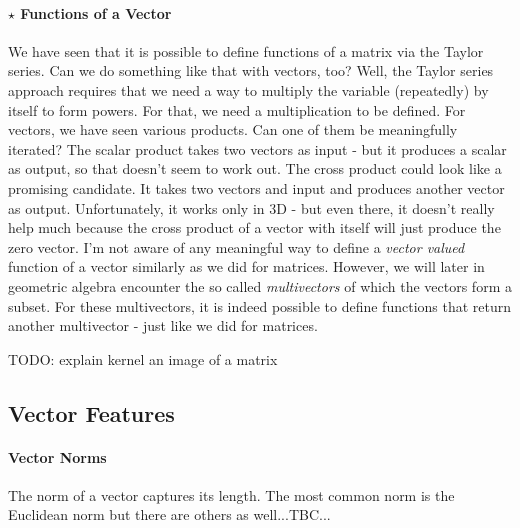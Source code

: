 \paragraph{$\star$ Functions of a Vector}
We have seen that it is possible to define functions of a matrix via the Taylor series. Can we do something like that with vectors, too? Well, the Taylor series approach requires that we need a way to multiply the variable (repeatedly) by itself to form powers. For that, we need a multiplication to be defined. For vectors, we have seen various products. Can one of them be meaningfully iterated? The scalar product takes two vectors as input - but it produces a scalar as output, so that doesn't seem to work out. The cross product could look like a promising candidate. It takes two vectors and input and produces another vector as output. Unfortunately, it works only in 3D - but even there, it doesn't really help much because the cross product of a vector with itself will just produce the zero vector. I'm not aware of any meaningful way to define a \emph{vector valued} function of a vector similarly as we did for matrices. However, we will later in geometric algebra encounter the so called \emph{multivectors} of which the vectors form a subset. For these multivectors, it is indeed possible to define functions that return another multivector - just like we did for matrices.

\medskip
TODO: explain kernel an image of a matrix







\subsection{Vector Features}

\paragraph{Vector Norms}
The norm of a vector captures its length. The most common norm is the Euclidean norm but there are others as well...TBC...


